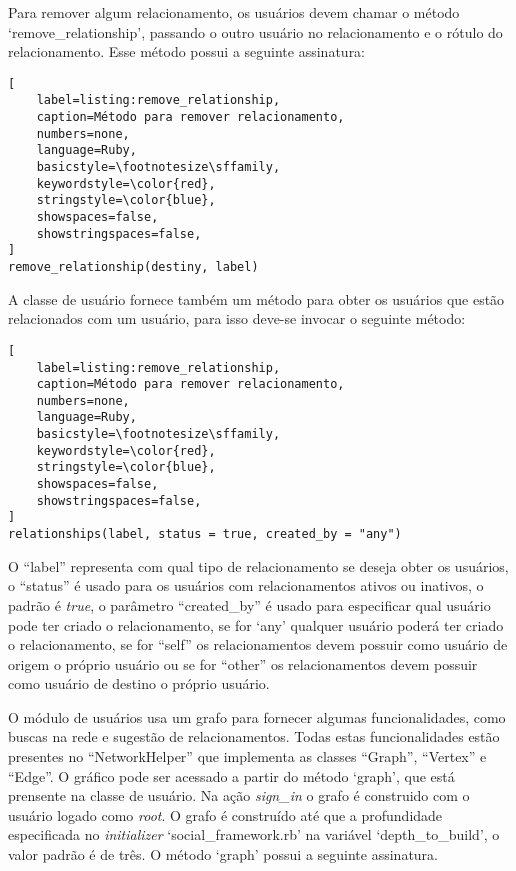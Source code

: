 Para remover algum relacionamento, os usuários devem chamar o método `remove\_relationship', passando o outro usuário no relacionamento e o rótulo do relacionamento. Esse método possui a seguinte assinatura:

\begin{lstlisting}[
    label=listing:remove_relationship,
    caption=Método para remover relacionamento,
    numbers=none,
    language=Ruby,
    basicstyle=\footnotesize\sffamily,
    keywordstyle=\color{red},
    stringstyle=\color{blue},
    showspaces=false,
    showstringspaces=false,
]
remove_relationship(destiny, label)
\end{lstlisting}

A classe de usuário fornece também um método para obter os usuários que estão relacionados com um usuário, para isso deve-se invocar o seguinte método:

\begin{lstlisting}[
    label=listing:remove_relationship,
    caption=Método para remover relacionamento,
    numbers=none,
    language=Ruby,
    basicstyle=\footnotesize\sffamily,
    keywordstyle=\color{red},
    stringstyle=\color{blue},
    showspaces=false,
    showstringspaces=false,
]
relationships(label, status = true, created_by = "any")
\end{lstlisting}

O ``label'' representa com qual tipo de relacionamento se deseja obter os usuários, o ``status'' é usado para os usuários com relacionamentos ativos ou inativos, o padrão é \textit{true}, o parâmetro ``created\_by'' é usado para especificar qual usuário pode ter criado o relacionamento, se for `any' qualquer usuário poderá ter criado o relacionamento, se for ``self'' os relacionamentos devem possuir como usuário de origem o próprio usuário ou se for ``other'' os relacionamentos devem possuir como usuário de destino o próprio usuário.

O módulo de usuários usa um grafo para fornecer algumas funcionalidades, como buscas na rede e sugestão de relacionamentos. Todas estas funcionalidades estão presentes no ``NetworkHelper'' que implementa as classes ``Graph'', ``Vertex'' e ``Edge''. O gráfico pode ser acessado a partir do método `graph', que está prensente na classe de usuário. Na ação \textit{sign\_in} o grafo é construido com o usuário logado como \textit{root}. O grafo é construído até que a profundidade especificada no \textit{initializer} `social\_framework.rb' na variável `depth\_to\_build', o valor padrão é de três. O método `graph' possui a seguinte assinatura.

